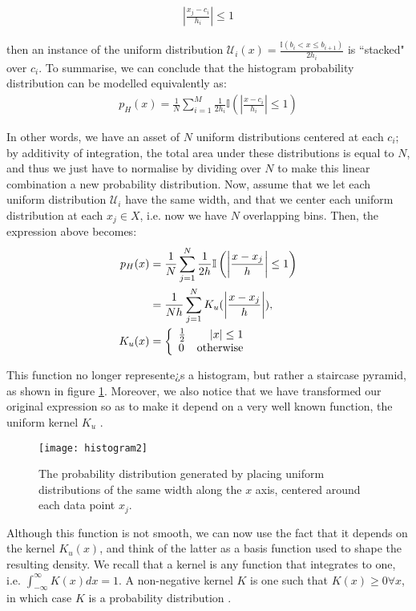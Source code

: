 \documentclass[../main.tex]{subfiles}
\begin{document}
\begin{align*}
\left|\frac{x_j - c_i}{h_i}\right| \leq 1
\end{align*}
\par then an instance of the uniform distribution $\mathcal{U}_i(x) = \frac{\mathbb{I}(b_i < x \leq b_{i+1})}{2h_i}$ is ``stacked" over $c_i$. To summarise, we can conclude that the histogram probability distribution can be modelled equivalently as:
\begin{align*}
p_H(x) = \frac{1}{N}\sum_{i=1}^M\frac{1}{2h_i}\mathbb{I}\left(\left|\frac{x - c_i}{h_i}\right| \leq 1\right)
\end{align*}
\par In other words, we have an asset of $N$ uniform distributions centered at each $c_i$; by additivity of integration, the total area under these distributions is equal to $N$, and thus we just have to normalise by dividing over $N$ to make this linear combination a new probability distribution. Now, assume that we let each uniform distribution $\mathcal{U}_i$ have the same width, and that we center each uniform distribution at each $x_j \in X$, i.e. now we have $N$ overlapping bins. Then, the expression above becomes:
\begin{align*}
p_{H}(x) &= \frac{1}{N}\sum_{j=1}^N\frac{1}{2h}\mathbb{I}\left(\left|\frac{x - x_j}{h}\right| \leq 1\right)\\
&= \frac{1}{Nh}\sum_{j=1}^NK_u(\left|\frac{x - x_j}{h}\right|),\\
K_u(x) &= \left\{
     \begin{array}{lr}
      \frac{1}{2} & \lvert x\rvert \leq 1 \\
      0 & \text{otherwise} 
     \end{array}
   \right.
\end{align*}
\par This function no longer represente¿s a histogram, but rather a staircase pyramid, as shown in figure \ref{fig_hist2}. Moreover, we also notice that we have transformed our original expression so as to make it depend on a very well known function, the uniform kernel $K_u$ \cite{Hansen2009}. 
\begin{figure}[t]
\centering
\texttt{[image: histogram2]}
\caption{The probability distribution generated by placing uniform distributions of the same width along the $x$ axis, centered around each data point $x_j$.}
\label{fig_hist2}
\end{figure}
\par Although this function is not smooth, we can now use the fact that it depends on the kernel $K_u(x)$, and think of the latter as a basis function used to shape the resulting density. We recall that a kernel is any function that integrates to one, i.e. $\int_{-\infty}^\infty K(x)dx = 1$. A non-negative kernel $K$ is one such that $K(x) \geq 0 \forall x$, in which case $K$ is a probability distribution \cite{Hansen2009}.
\end{document}
